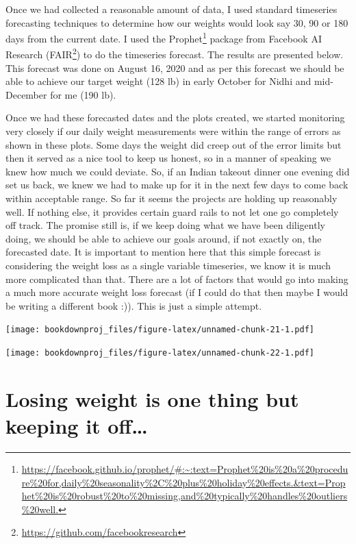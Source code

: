 \documentclass[
  oneside]{book}
\DeclareRobustCommand{\href}[2]{#2\footnote{\url{#1}}}
\begin{document}
Once we had collected a reasonable amount of data, I used standard timeseries forecasting techniques to determine how our weights would look say 30, 90 or 180 days from the current date. I used the \href{https://facebook.github.io/prophet/\#:~:text=Prophet\%20is\%20a\%20procedure\%20for,daily\%20seasonality\%2C\%20plus\%20holiday\%20effects.\&text=Prophet\%20is\%20robust\%20to\%20missing,and\%20typically\%20handles\%20outliers\%20well.}{Prophet} package from Facebook AI Research (\href{https://github.com/facebookresearch}{FAIR}) to do the timeseries forecast. The results are presented below. This forecast was done on August 16, 2020 and as per this forecast we should be able to achieve our target weight (128 lb) in early October for Nidhi and mid-December for me (190 lb).

Once we had these forecasted dates and the plots created, we started monitoring very closely if our daily weight measurements were within the range of errors as shown in these plots. Some days the weight did creep out of the error limits but then it served as a nice tool to keep us honest, so in a manner of speaking we knew how much we could deviate. So, if an Indian takeout dinner one evening did set us back, we knew we had to make up for it in the next few days to come back within acceptable range. So far it seems the projects are holding up reasonably well. If nothing else, it provides certain guard rails to not let one go completely off track. The promise still is, if we keep doing what we have been diligently doing, we should be able to achieve our goals around, if not exactly on, the forecasted date. It is important to mention here that this simple forecast is considering the weight loss as a single variable timeseries, we know it is much more complicated than that. There are a lot of factors that would go into making a much more accurate weight loss forecast (if I could do that then maybe I would be writing a different book :)). This is just a simple attempt.

\texttt{[image: bookdownproj\_files/figure-latex/unnamed-chunk-21-1.pdf]}

\texttt{[image: bookdownproj\_files/figure-latex/unnamed-chunk-22-1.pdf]}

\hypertarget{losing-weight-is-one-thing-but-keeping-it-off}{%
\section{Losing weight is one thing but keeping it off\ldots{}}\label{losing-weight-is-one-thing-but-keeping-it-off}}
\end{document}
